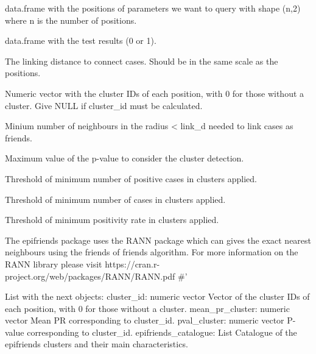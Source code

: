 \documentclass[a4paper]{book}
\begin{document}
%
\begin{Arguments}
\begin{ldescription}
\item[\code{positions}] data.frame with the positions of parameters we want to query with shape (n,2) where n is the number of positions.

\item[\code{test\_result}] data.frame with the test results (0 or 1).

\item[\code{link\_d}] The linking distance to connect cases. Should be in the same scale as the positions.

\item[\code{cluster\_id}] Numeric vector with the cluster IDs of each position, with 0 for those without a cluster. Give NULL if cluster\_id must be calculated.

\item[\code{min\_neighbours}] Minium number of neighbours in the radius < link\_d needed to link cases as friends.

\item[\code{max\_p}] Maximum value of the p-value to consider the cluster detection.

\item[\code{min\_pos}] Threshold of minimum number of positive cases in clusters applied.

\item[\code{min\_total}] Threshold of minimum number of cases in clusters applied.

\item[\code{min\_pr}] Threshold of minimum positivity rate in clusters applied.
\end{ldescription}
\end{Arguments}
%
\begin{Details}\relax
The epifriends package uses the RANN package which can gives the exact nearest neighbours using the friends of friends algorithm. For more information on the RANN library please visit https://cran.r-project.org/web/packages/RANN/RANN.pdf
\#'
\end{Details}
%
\begin{Value}
List with the next objects:
cluster\_id: numeric vector
Vector of the cluster IDs of each position, with 0 for those
without a cluster.
mean\_pr\_cluster: numeric vector
Mean PR corresponding to cluster\_id.
pval\_cluster: numeric vector
P-value corresponding to cluster\_id.
epifriends\_catalogue: List
Catalogue of the epifriends clusters and their main characteristics.
\end{Value}
\end{document}
